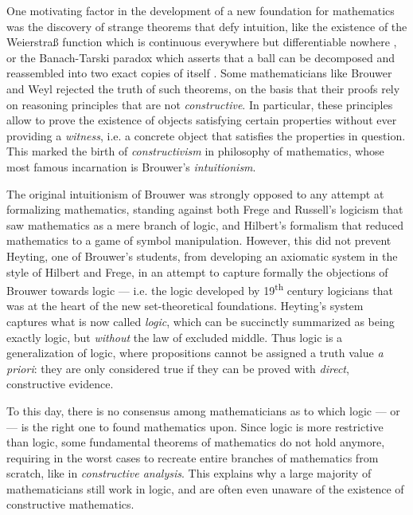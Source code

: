 One motivating factor in the development of a new foundation for mathematics was
the discovery of strange theorems that defy intuition, like the existence of the
Weierstra{\ss} function which is continuous everywhere but differentiable
nowhere , or the Banach-Tarski paradox which
asserts that a ball can be decomposed and reassembled into two exact copies of
itself . Some mathematicians like Brouwer and Weyl
rejected the truth of such theorems, on the basis that their proofs rely on
reasoning principles that are not \emph{constructive}. In particular, these principles
allow to prove the existence of objects satisfying certain properties without
ever providing a \emph{witness}, i.e. a concrete object that satisfies the
properties in question. This marked the birth of \emph{constructivism} in
philosophy of mathematics, whose most famous incarnation is Brouwer's
\emph{intuitionism}.

The original intuitionism of Brouwer was strongly opposed to any attempt at
formalizing mathematics, standing against both Frege and Russell's logicism that
saw mathematics as a mere branch of logic, and Hilbert's formalism that reduced
mathematics to a game of symbol manipulation. However, this did not prevent
Heyting, one of Brouwer's students, from developing an axiomatic system in the
style of Hilbert and Frege, in an attempt to capture formally the objections of
Brouwer towards  logic --- i.e. the logic developed by
19\textsuperscript{th} century logicians that was at the heart of the new
set-theoretical foundations. Heyting's system captures what is now called
\emph{ logic}, which can be succinctly summarized as being
exactly  logic, but \emph{without} the law of excluded middle.
Thus  logic is a generalization of  logic,
where propositions cannot be assigned a truth value \emph{a priori}: they are
only considered true if they can be proved with \emph{direct}, constructive
evidence.

To this day, there is no consensus among mathematicians as to which logic ---
 or  --- is the right one to found mathematics upon.
Since  logic is more restrictive than  logic, some
fundamental theorems of  mathematics do not hold anymore, requiring in
the worst cases to recreate entire branches of mathematics from scratch, like in
\emph{constructive analysis}. This explains why a large majority of
mathematicians still work in  logic, and are often even unaware of the
existence of constructive mathematics.

